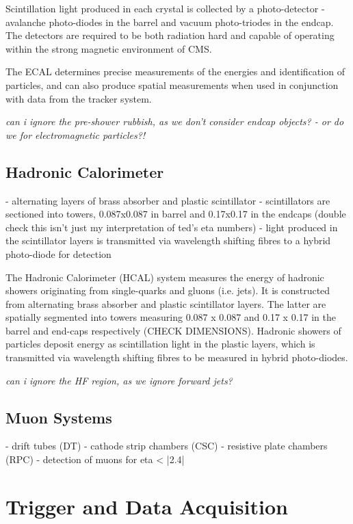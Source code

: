 Scintillation light produced in each crystal is collected by a photo-detector - 
avalanche photo-diodes in the barrel and vacuum photo-triodes in the endcap. The
detectors are required to be both radiation hard and capable of operating within
the strong magnetic environment of CMS.

The ECAL determines precise measurements of the energies and identification of
particles, and can also produce spatial measurements when used in conjunction 
with data from the tracker system.

\emph{can i ignore the pre-shower rubbish, as we don't consider endcap objects? 
- or do we for electromagnetic particles?!}

\subsection{Hadronic Calorimeter}

- alternating layers of brass absorber and plastic scintillator
- scintillators are sectioned into towers, 0.087x0.087 in barrel and 0.17x0.17 
in the endcaps (double check this isn't just my interpretation of ted's eta 
numbers)
- light produced in the scintillator layers is transmitted via wavelength 
shifting fibres to a hybrid photo-diode for detection

The Hadronic Calorimeter (HCAL) system measures the energy of hadronic showers 
originating from single-quarks and gluons (i.e. jets). It is constructed from
alternating  brass absorber and plastic scintillator layers. The latter are spatially 
segmented into towers measuring 0.087 x 0.087 and 0.17 x 0.17 in the barrel and 
end-caps respectively (CHECK DIMENSIONS). Hadronic showers of particles deposit 
energy as scintillation light in the plastic layers, which is transmitted via 
wavelength shifting fibres to be measured in hybrid photo-diodes. 

\emph{can i ignore the HF region, as we ignore forward jets?}

\subsection{Muon Systems}

- drift tubes (DT)
- cathode strip chambers (CSC)
- resistive plate chambers (RPC)
- detection of muons for eta < |2.4|

\section{Trigger and Data Acquisition}  %
\label{sec:detector_trigger}

